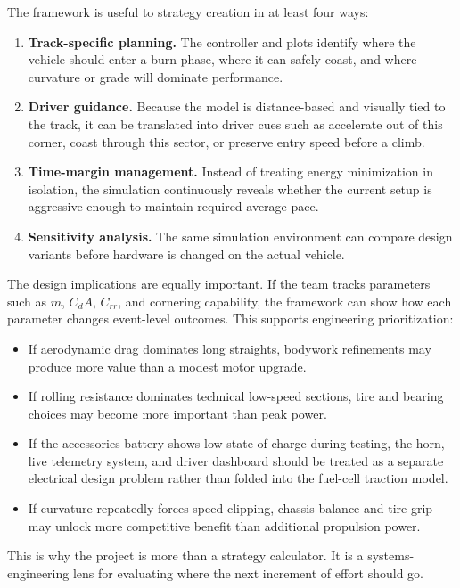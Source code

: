 \documentclass[11pt]{article}
\begin{document}
The framework is useful to strategy creation in at least four ways:

\begin{enumerate}[leftmargin=1.5em]
\item \textbf{Track-specific planning.} The controller and plots identify where the vehicle should enter a burn phase, where it can safely coast, and where curvature or grade will dominate performance.
\item \textbf{Driver guidance.} Because the model is distance-based and visually tied to the track, it can be translated into driver cues such as accelerate out of this corner, coast through this sector, or preserve entry speed before a climb.
\item \textbf{Time-margin management.} Instead of treating energy minimization in isolation, the simulation continuously reveals whether the current setup is aggressive enough to maintain required average pace.
\item \textbf{Sensitivity analysis.} The same simulation environment can compare design variants before hardware is changed on the actual vehicle.
\end{enumerate}

The design implications are equally important. If the team tracks parameters such as \(m\), \(C_dA\), \(C_{rr}\), and cornering capability, the framework can show how each parameter changes event-level outcomes. This supports engineering prioritization:

\begin{itemize}[leftmargin=1.5em]
\item If aerodynamic drag dominates long straights, bodywork refinements may produce more value than a modest motor upgrade.
\item If rolling resistance dominates technical low-speed sections, tire and bearing choices may become more important than peak power.
\item If the accessories battery shows low state of charge during testing, the horn, live telemetry system, and driver dashboard should be treated as a separate electrical design problem rather than folded into the fuel-cell traction model.
\item If curvature repeatedly forces speed clipping, chassis balance and tire grip may unlock more competitive benefit than additional propulsion power.
\end{itemize}

This is why the project is more than a strategy calculator. It is a systems-engineering lens for evaluating where the next increment of effort should go.
\end{document}
